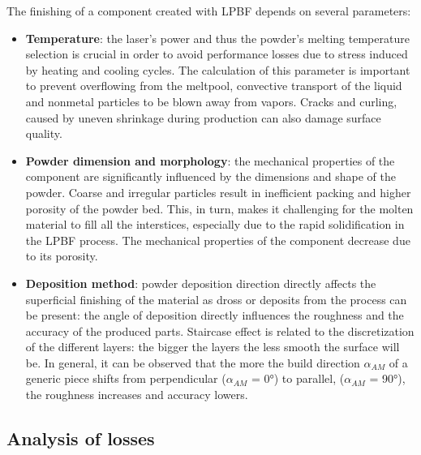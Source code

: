 The finishing of a component created with LPBF depends on several parameters: 

\begin{itemize}
    \item \textbf{Temperature}: the laser's power and thus the powder's melting temperature selection is crucial in order to avoid performance losses due to stress induced by heating and cooling cycles. The calculation of this parameter is important to prevent overflowing from the meltpool, convective transport of the liquid and nonmetal particles to be blown away from vapors. Cracks and curling, caused by uneven shrinkage during production can also damage surface quality\cite{lpbf_accuracy}. 
    \item  \textbf{Powder dimension and morphology}: the mechanical properties of the component are significantly influenced by the dimensions and shape of the powder. Coarse and irregular particles result in inefficient packing and higher porosity of the powder bed. This, in turn, makes it challenging for the molten material to fill all the interstices, especially due to the rapid solidification in the LPBF process. The mechanical properties of the component decrease due to its porosity\cite{dimension_powder}.
    \item  \textbf{Deposition method}: powder deposition direction directly affects the superficial finishing of the material as dross or deposits from the process can be present: the angle of deposition directly influences the roughness and the accuracy of the produced parts. Staircase effect is related to the discretization of the different layers: the bigger the layers the less smooth the surface will be. In general, it can be observed that the more the build direction $\alpha_{AM}$ of a generic piece shifts from perpendicular ($\alpha_{AM}$ = 0°) to parallel, ($\alpha_{AM}$ = 90°), the roughness increases and accuracy lowers\cite{tesi_dottorato}.
\end{itemize}


\subsection{Analysis of losses}
\label{subsec:losses_intro}

